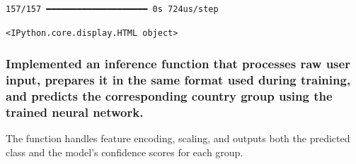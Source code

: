 \documentclass[
  letterpaper,
  DIV=11,
  numbers=noendperiod]{scrartcl}
\begin{document}
\begin{verbatim}
157/157 ━━━━━━━━━━━━━━━━━━━━ 0s 724us/step
\end{verbatim}

\begin{verbatim}
<IPython.core.display.HTML object>
\end{verbatim}

\subsubsection{Implemented an inference function that processes raw user
input, prepares it in the same format used during training, and predicts
the corresponding country group using the trained neural
network.}\label{implemented-an-inference-function-that-processes-raw-user-input-prepares-it-in-the-same-format-used-during-training-and-predicts-the-corresponding-country-group-using-the-trained-neural-network.}

The function handles feature encoding, scaling, and outputs both the
predicted class and the model's confidence scores for each group.
\end{document}
